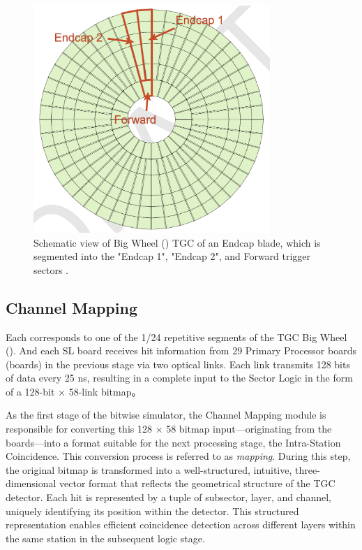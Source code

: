 \begin{figure}[htbp]
  \centering
  \includegraphics[width=0.8\textwidth]{figs/chapter5/endcap_and_forward_region.png}
  \caption{Schematic view of Big Wheel (\BW) TGC of an Endcap \SL blade, which is segmented into the "Endcap 1", "Endcap 2", and Forward trigger sectors \cite{EndcapSLPDR}.}
  \label{fig:endcapAndForward}
\end{figure}

\subsection{Channel Mapping} \label{subsec:ChannelMapping}
Each \SL corresponds to one of the 1/24 repetitive segments of the TGC Big Wheel (\BW). And each SL board receives hit information from 29 Primary Processor boards (\PS boards) in the previous stage via two optical links. Each link transmits 128 bits of data every 25 ns, resulting in a complete input to the Sector Logic in the form of a 128-bit $\times$ 58-link bitmap。

As the first stage of the bitwise simulator, the Channel Mapping module is responsible for converting this 128 $\times$ 58 bitmap input—originating from the \PS boards—into a format suitable for the next processing stage, the Intra-Station Coincidence. This conversion process is referred to as \textit{mapping}. During this step, the original bitmap is transformed into a well-structured, intuitive, three-dimensional vector format that reflects the geometrical structure of the TGC detector. Each hit is represented by a tuple of subsector, layer, and channel, uniquely identifying its position within the detector. This structured representation enables efficient coincidence detection across different layers within the same station in the subsequent logic stage.
